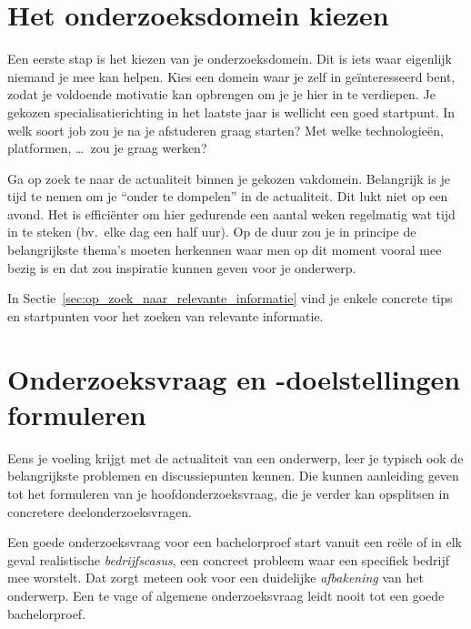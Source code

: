 \section{Het onderzoeksdomein kiezen}%
\label{sec:het_onderzoeksdomein_kiezen}

Een eerste stap is het kiezen van je onderzoeksdomein. Dit is iets waar eigenlijk niemand je mee kan helpen. Kies een domein waar je zelf in geïnteresseerd bent, zodat je voldoende motivatie kan opbrengen om je je hier in te verdiepen. Je gekozen specialisatierichting in het laatste jaar is wellicht een goed startpunt. In welk soort job zou je na je afstuderen graag starten? Met welke technologieën, platformen, \ldots\ zou je graag werken?

Ga op zoek te naar de actualiteit binnen je gekozen vakdomein. Belangrijk is je tijd te nemen om je ``onder te dompelen'' in de actualiteit. Dit lukt niet op een avond. Het is efficiënter om hier gedurende een aantal weken regelmatig wat tijd in te steken (bv.\ elke dag een half uur). Op de duur zou je in principe de belangrijkste thema's moeten herkennen waar men op dit moment vooral mee bezig is en dat zou inspiratie kunnen geven voor je onderwerp.

In Sectie~\ref{sec:op_zoek_naar_relevante_informatie} vind je enkele concrete tips en startpunten voor het zoeken van relevante informatie.

\section{Onderzoeksvraag en -doelstellingen formuleren}%
\label{sec:onderzoeksvraag_formuleren}

Eens je voeling krijgt met de actualiteit van een onderwerp, leer je typisch ook de belangrijkste problemen en discussiepunten kennen. Die kunnen aanleiding geven tot het formuleren van je hoofdonderzoeksvraag, die je verder kan opsplitsen in concretere deelonderzoeksvragen.

Een goede onderzoeksvraag voor een bachelorproef start vanuit een reële of in elk geval realistische \textit{bedrijfscasus}, een concreet probleem waar een specifiek bedrijf mee worstelt. Dat zorgt meteen ook voor een duidelijke \textit{afbakening} van het onderwerp. Een te vage of algemene onderzoeksvraag leidt nooit tot een goede bachelorproef.

